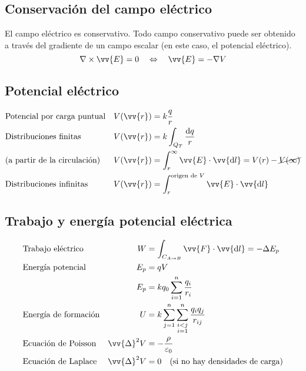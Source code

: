 \documentclass[a4paper, 8pt]{extarticle}
\renewcommand{\vec}[1]{\vv{{#1}}}
\renewcommand{\grad}{\nabla}
\begin{document}
\begin{multicols}{3}
  \subsection{Conservación del campo eléctrico}
  El campo eléctrico es conservativo. Todo campo conservativo puede ser obtenido a través del gradiente de un campo escalar (en este caso, el potencial eléctrico).
  \[ \grad \times \vec{E} = 0 \quad \Leftrightarrow \quad \vec{E} = - \grad V \]

  \subsection{Potencial eléctrico}
  \begin{align*}
     & \text{Potencial por carga puntual}  & V(\vec{r}) & = k \frac{q}{r}                                                           \\
     & \text{Distribuciones finitas}       & V(\vec{r}) & = k \int_{Q_T} \frac{\dd q}{r}                                            \\
     & \text{(a partir de la circulación)} & V(\vec{r}) & = \int_{r}^{\infty} \vec{E} \cdot \vec{\dd l} = V(r) - \cancel{V(\infty)} \\
     & \text{Distribuciones infinitas}     & V(\vec{r}) & = \int_{r}^{\text{origen de }V} \vec{E} \cdot \vec{\dd l}
  \end{align*}

  \subsection{Trabajo y energía potencial eléctrica}
  \begin{align*}
     & \text{Trabajo eléctrico}    & W                 & = \int_{C_{A \to B}}\vec{F}\cdot \vec{\dd l} = -\Delta E_p \\
     & \text{Energía potencial}    & E_p               & = q V                                                      \\
     &                             & E_p               & = kq_0 \sum_{i=1}^{n}\frac{q_i}{r_i}                       \\
     & \text{Energía de formación} & U                 & = k \sum_{j=1}^{n}\sum_{\substack{i<j                      \\ i=1}}^{n} \frac{q_iq_j}{r_{ij}} \\
     & \text{Ecuación de Poisson}  & \vec{\Delta} ^2 V & = - \frac{\rho}{\varepsilon_0}                             \\
     & \text{Ecuación de Laplace}  & \vec{\Delta} ^2 V & = 0 \quad \text{(si no hay densidades de carga)}
  \end{align*}


\end{multicols}
\end{document}
